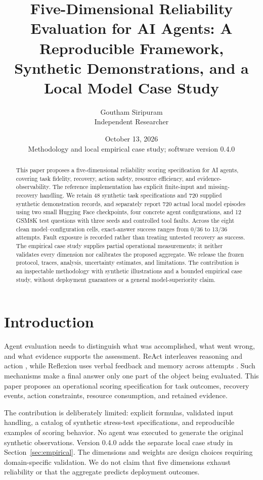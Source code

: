 \documentclass[11pt]{article}
\title{Five-Dimensional Reliability Evaluation for AI Agents: A Reproducible Framework, Synthetic Demonstrations, and a Local Model Case Study}
\author{Goutham Siripuram\\Independent Researcher}
\date{October 13, 2026\\\small Methodology and local empirical case study; software version 0.4.0}
\begin{document}
\maketitle
\begin{abstract}
This paper proposes a five-dimensional reliability scoring specification for AI agents, covering task fidelity, recovery, action safety, resource efficiency, and evidence-observability. The reference implementation has explicit finite-input and missing-recovery handling. We retain 48 synthetic task specifications and 720 supplied synthetic demonstration records, and separately report 720 actual local model episodes using two small Hugging Face checkpoints, four concrete agent configurations, and 12 GSM8K test questions with three seeds and controlled tool faults. Across the eight clean model--configuration cells, exact-answer success ranges from 0/36 to 13/36 attempts. Fault exposure is recorded rather than treating untested recovery as success. The empirical case study supplies partial operational measurements; it neither validates every dimension nor calibrates the proposed aggregate. We release the frozen protocol, traces, analysis, uncertainty estimates, and limitations. The contribution is an inspectable methodology with synthetic illustrations and a bounded empirical case study, without deployment guarantees or a general model-superiority claim.
\end{abstract}

\section{Introduction}
Agent evaluation needs to distinguish what was accomplished, what went wrong, and what evidence supports the assessment. ReAct interleaves reasoning and action \cite{yao2023react}, while Reflexion uses verbal feedback and memory across attempts \cite{shinn2023reflexion}. Such mechanisms make a final answer only one part of the object being evaluated. This paper proposes an operational scoring specification for task outcomes, recovery events, action constraints, resource consumption, and retained evidence.

The contribution is deliberately limited: explicit formulas, validated input handling, a catalog of synthetic stress-test specifications, and reproducible examples of scoring behavior. No agent was executed to generate the original synthetic observations. Version 0.4.0 adds the separate local case study in Section~\ref{sec:empirical}. The dimensions and weights are design choices requiring domain-specific validation. We do not claim that five dimensions exhaust reliability or that the aggregate predicts deployment outcomes.
\end{document}
